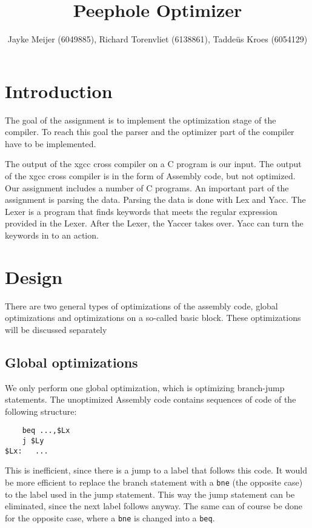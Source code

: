 \documentclass[10pt,a4paper]{article}
\title{Peephole Optimizer}
\author{Jayke Meijer (6049885), Richard Torenvliet (6138861), Tadde\"us Kroes
    (6054129)}
\begin{document}
\maketitle
\tableofcontents
\pagebreak

\section{Introduction}

The goal of the assignment is to implement the optimization stage of the
compiler. To reach this goal the parser and the optimizer part of the compiler
have to be implemented.

The output of the xgcc cross compiler on a C program is our input. The output
of the xgcc cross compiler is in the form of Assembly code, but not optimized.
Our assignment includes a number of C programs. An important part of the
assignment is parsing the data. Parsing the data is done with Lex and Yacc. The
Lexer is a program that finds keywords that meets the regular expression
provided in the Lexer. After the Lexer, the Yaccer takes over. Yacc can turn
the keywords in to an action.

\section{Design}

There are two general types of optimizations of the assembly code, global
optimizations and optimizations on a so-called basic block. These optimizations
will be discussed separately

\subsection{Global optimizations}

We only perform one global optimization, which is optimizing branch-jump
statements. The unoptimized Assembly code contains sequences of code of the
following structure:
\begin{verbatim}
    beq ...,$Lx
    j $Ly
$Lx:   ...
\end{verbatim}
This is inefficient, since there is a jump to a label that follows this code.
It would be more efficient to replace the branch statement with a \texttt{bne}
(the opposite case) to the label used in the jump statement. This way the jump
statement can be eliminated, since the next label follows anyway. The same can
of course be done for the opposite case, where a \texttt{bne} is changed into a
\texttt{beq}.
\end{document}
